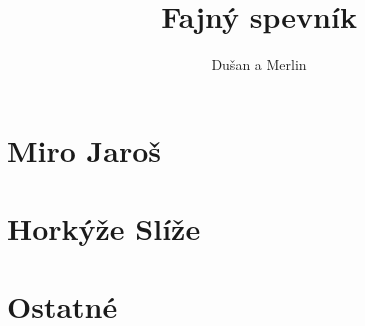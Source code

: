 \documentclass[a4paper]{article}
\title{Fajný spevník}
\author{Dušan a Merlin}
\date{}
\begin{document}
\maketitle
\clearpage
\tableofcontents
\clearpage
\begin{multicols}{3}
\section{Miro Jaroš}
	
	
	
	
	
	

\section{Horkýže Slíže}
	
	

\section{Ostatné}
	
	

\end{multicols}
\end{document}
